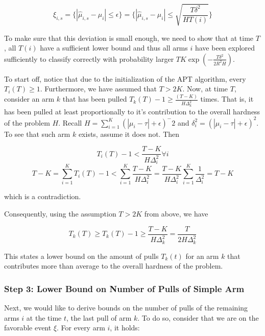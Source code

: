 \documentclass[12pt,]{article}
\begin{document}
\begin{equation}
\xi_{i,s} = \{ |\hat{\mu}_{i,s}-\mu_i | \leq \epsilon \} = \{ |\hat{\mu}_{i,s} - \mu_i | \leq \sqrt{\frac{T \delta^2}{H T(i)}}\}
\end{equation}

To make sure that this deviation is small enough, we need to show that
at time \(T\), all \(T(i)\) have a sufficient lower bound and thus all
arms \(i\) have been explored sufficiently to classify correctly with
probability larger \(TK \exp(-\frac{T\delta^2}{2R^2H})\).

To start off, notice that due to the initialization of the APT
algorithm, every \(T_i(T) \geq 1\). Furthermore, we have assumed that
\(T>2K\). Now, at time \(T\), consider an arm \(k\) that has been pulled
\(T_k(T) -1 \geq \frac{(T-K)}{H \Delta^2_k}\) times. That is, it has
been pulled at least proportionally to it's contribution to the overall
hardness of the problem \(H\). Recall
\(H = \sum_{i=1}^K(|\mu_i - \tau|+\epsilon)^-2\) and
\(\delta^2_i = (|\mu_i - \tau | + \epsilon)^2\). To see that such arm
\(k\) exists, assume it does not. Then

\begin{equation*}
T_i(T) - 1 < \frac{T-K}{H \Delta_i^2} \forall i
\end{equation*}\begin{equation*}
T- K = \sum_{i=1}^{K} T_i(T) - 1 < \sum_{i=1}^{K} \frac{T-K}{H \Delta_i^2} = \frac{T-K}{H \Delta_i^2} \sum_{i=1}^{K} \frac{1}{\Delta_i^2} = T-K
\end{equation*}

which is a contradiction.

Consequently, using the assumption \(T>2K\) from above, we have

\begin{equation*}
T_k(T) \geq T_k(T) - 1 \geq \frac{T-K}{H \Delta^2_k} = \frac{T}{2H\Delta_k^2}
\end{equation*}

This states a lower bound on the amount of pulls \(T_k(t)\) for an arm
\(k\) that contributes more than average to the overall hardness of the
problem.

\subsubsection{Step 3: Lower Bound on Number of Pulls of Simple
Arm}\label{step-3-lower-bound-on-number-of-pulls-of-simple-arm}

Next, we would like to derive bounds on the number of pulls of the
remaining arms \(i\) at the time \(t\), the last pull of arm \(k\). To
do so, consider that we are on the favorable event \(\xi\). For every
arm \(i\), it holds:
\end{document}
